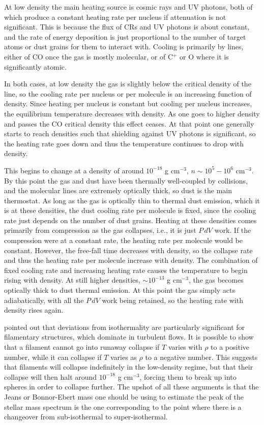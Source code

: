 At low density the main heating source is cosmic rays and UV photons, both of which produce a constant heating rate per nucleus if attenuation is not significant. This is because the flux of CRs and UV photons is about constant, and the rate of energy deposition is just proportional to the number of target atoms or dust grains for them to interact with. Cooling is primarily by lines, either of CO once the gas is mostly molecular, or of C$^+$ or O where it is significantly atomic.

In both cases, at low density the gas is slightly below the critical density of the line, so the cooling rate per nucleus or per molecule is an increasing function of density. Since heating per nucleus is constant but cooling per nucleus increases, the equilibrium temperature decreases with density. As one goes to higher density and passes the CO critical density this effect ceases. At that point one generally starts to reach densities such that shielding against UV photons is significant, so the heating rate goes down and thus the temperature continues to drop with density.

This begins to change at a density of around $10^{-18}$ g cm$^{-3}$, $n\sim 10^5 - 10^6$ cm$^{-3}$. By this point the gas and dust have been thermally well-coupled by collisions, and the molecular lines are extremely optically thick, so dust is the main thermostat. As long as the gas is optically thin to thermal dust emission, which it is at these densities, the dust cooling rate per molecule is fixed, since the cooling rate just depends on the number of dust grains. Heating at these densities comes primarily from compression as the gas collapses, i.e., it is just $P\, dV$ work. If the compression were at a constant rate, the heating rate per molecule would be constant. However, the free-fall time decreases with density, so the collapse rate and thus the heating rate per molecule increase with density. The combination of fixed cooling rate and increasing heating rate causes the temperature to begin rising with density. At still higher densities, $\sim 10^{-13}$ g cm$^{-3}$, the gas becomes optically thick to dust thermal emission. At this point the gas simply acts adiabatically, with all the $P\,dV$ work being retained, so the heating rate with density rises again.

\citet{larson05a} pointed out that deviations from isothermality are particularly significant for filamentary structures, which dominate in turbulent flows.  It is possible to show that a filament cannot go into runaway collapse if $T$ varies with $\rho$ to a positive number, while it can collapse if $T$ varies as $\rho$ to a negative number. This suggests that filaments will collapse indefinitely in the low-density regime, but that their collapse will then halt around $10^{-18}$ g cm$^{-3}$, forcing them to break up into spheres in order to collapse further. The upshot of all these arguments is that the Jeans or Bonnor-Ebert mass one should be using to estimate the peak of the stellar mass spectrum is the one corresponding to the point where there is a changeover from sub-isothermal to super-isothermal.

